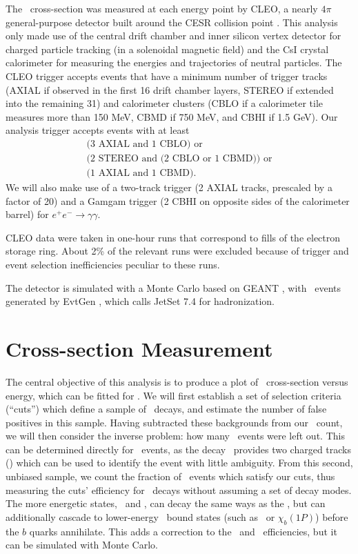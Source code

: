 \documentclass[aps,prd,preprint,superscriptaddress,tightenlines,nofootinbib,floatfix]{revtex4}
\begin{document}
The \ups\ cross-section was measured at each energy point by CLEO, a
nearly $4\pi$ general-purpose detector built around the CESR collision
point \cite{cleo}.  This analysis only made use of the central drift chamber and
inner silicon vertex detector for charged particle tracking (in a
solenoidal magnetic field) and the CsI crystal calorimeter for
measuring the energies and trajectories of neutral particles.  The
CLEO trigger accepts events that have a minimum number of trigger
tracks (AXIAL if observed in the first 16 drift chamber layers, STEREO
if extended into the remaining 31) and calorimeter clusters (CBLO if a
calorimeter tile measures more than 150 MeV, CBMD if 750 MeV, and CBHI
if 1.5 GeV).  Our analysis trigger accepts events with at least
\begin{multline}
  \mbox{(3 AXIAL and 1 CBLO) or} \\
  \mbox{(2 STEREO and (2 CBLO or 1 CBMD)) or} \\
  \mbox{(1 AXIAL and 1 CBMD).} \label{eqn:trig}
\end{multline}
We will also make use of a two-track trigger (2 AXIAL tracks,
prescaled by a factor of 20) and a Gamgam trigger (2 CBHI on opposite
sides of the calorimeter barrel) for $e^+e^- \to \gamma\gamma$.

CLEO data were taken in one-hour runs that correspond to fills of the
electron storage ring.  About 2\% of the relevant runs were excluded
because of trigger and event selection inefficiencies peculiar to
these runs.

The detector is simulated with a Monte Carlo based on GEANT \cite{geant}, with
\ups\ events generated by EvtGen \cite{evtgen}, which calls JetSet 7.4 \cite{jetset} for
hadronization.

%
\section{Cross-section Measurement}
%

The central objective of this analysis is to produce a plot of \ups\
cross-section versus energy, which can be fitted for \gee.  We will
first establish a set of selection criteria (``cuts'') which define a
sample of \ups\ decays, and estimate the number of false positives in
this sample.  Having subtracted these backgrounds from our \ups\
count, we will then consider the inverse problem: how many \ups\
events were left out.  This can be determined directly for \uone\
events, as the decay \twotoone\ provides two charged tracks (\pip)
which can be used to identify the event with little ambiguity.  From
this second, unbiased sample, we count the fraction of \uone\ events
which satisfy our cuts, thus measuring the cuts' efficiency for \uone\
decays without assuming a set of decay modes.  The more energetic
states, \utwo\ and \uthree, can decay the same ways as the \uone, but
can additionally cascade to lower-energy \bbar\ bound states (such as
\uone\ or $\chi_b(1P)$) before the $b$ quarks annihilate.  This adds a
correction to the \utwo\ and \uthree\ efficiencies, but it can be
simulated with Monte Carlo.
\end{document}

